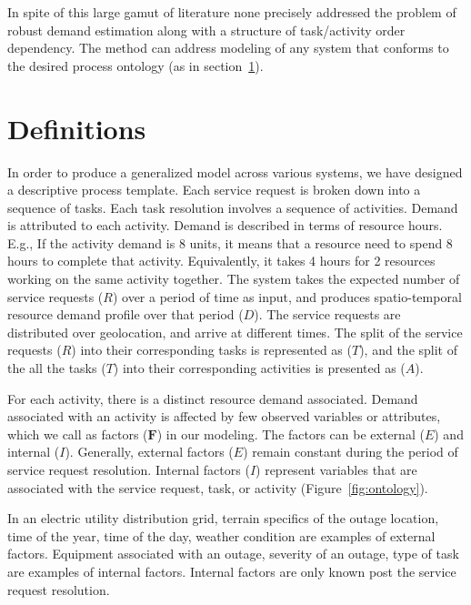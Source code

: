\documentclass[twoside,leqno,twocolumn]{article}
\begin{document}
\par
In spite of this large gamut of literature none precisely addressed the problem of robust demand estimation along with a structure of task/activity order dependency. The method can address modeling of any system that conforms to the desired process ontology (as in section~\ref{sec:definition}).  

\section{Definitions}
\label{sec:definition}
In order to produce a generalized model across various systems, we have designed a descriptive process template. Each service request is broken down into a sequence of tasks. Each task resolution involves a sequence of activities. Demand is attributed to each activity. Demand is described in terms of resource hours. E.g., If the activity demand is 8 units, it means that a resource need to spend 8 hours to complete that activity. Equivalently, it takes 4 hours for 2 resources working on the same activity together. The system takes the expected number of service requests ($R$) over a period of time as input, and produces spatio-temporal resource demand profile over that period ($D$). The service requests are distributed over geolocation, and arrive at different times. The split of the service requests ($R$) into their corresponding tasks is represented as ($T$), and the split of the all the tasks ($T$) into their corresponding activities is presented as ($A$). 
\par
For each activity, there is a distinct resource demand associated. Demand associated with an activity is affected by few observed variables or attributes, which we call as factors ($\mathbf{F}$) in our modeling. The factors can be external ($E$) and internal ($I$). Generally, external factors ($E$) remain constant during the period of service request resolution. Internal factors ($I$) represent variables that are associated with the service request, task, or activity (Figure~\ref{fig:ontology}). 
\par
In an electric utility distribution grid, terrain specifics of the outage location, time of the year, time of the day, weather condition are examples of external factors. Equipment associated with an outage, severity of an outage, type of task are examples of internal factors. Internal factors are only known post the service request resolution.
\par
\end{document}
